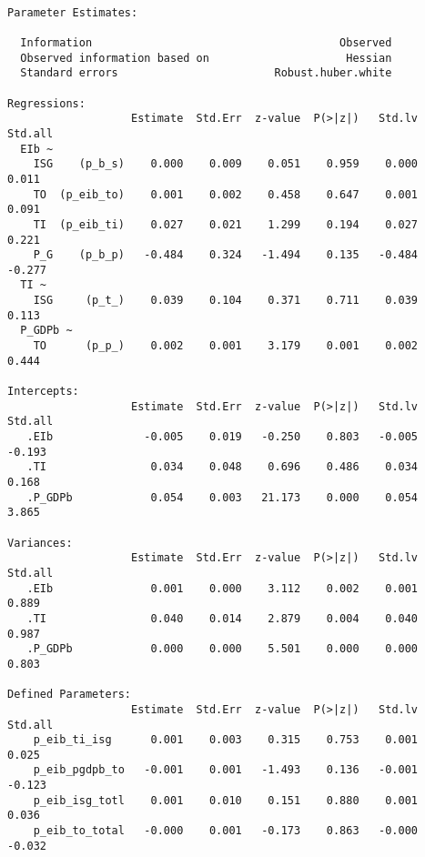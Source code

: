 \begin{verbatim}

Parameter Estimates:

  Information                                      Observed
  Observed information based on                     Hessian
  Standard errors                        Robust.huber.white

Regressions:
                   Estimate  Std.Err  z-value  P(>|z|)   Std.lv  Std.all
  EIb ~                                                                 
    ISG    (p_b_s)    0.000    0.009    0.051    0.959    0.000    0.011
    TO  (p_eib_to)    0.001    0.002    0.458    0.647    0.001    0.091
    TI  (p_eib_ti)    0.027    0.021    1.299    0.194    0.027    0.221
    P_G    (p_b_p)   -0.484    0.324   -1.494    0.135   -0.484   -0.277
  TI ~                                                                  
    ISG     (p_t_)    0.039    0.104    0.371    0.711    0.039    0.113
  P_GDPb ~                                                              
    TO      (p_p_)    0.002    0.001    3.179    0.001    0.002    0.444

Intercepts:
                   Estimate  Std.Err  z-value  P(>|z|)   Std.lv  Std.all
   .EIb              -0.005    0.019   -0.250    0.803   -0.005   -0.193
   .TI                0.034    0.048    0.696    0.486    0.034    0.168
   .P_GDPb            0.054    0.003   21.173    0.000    0.054    3.865

Variances:
                   Estimate  Std.Err  z-value  P(>|z|)   Std.lv  Std.all
   .EIb               0.001    0.000    3.112    0.002    0.001    0.889
   .TI                0.040    0.014    2.879    0.004    0.040    0.987
   .P_GDPb            0.000    0.000    5.501    0.000    0.000    0.803

Defined Parameters:
                   Estimate  Std.Err  z-value  P(>|z|)   Std.lv  Std.all
    p_eib_ti_isg      0.001    0.003    0.315    0.753    0.001    0.025
    p_eib_pgdpb_to   -0.001    0.001   -1.493    0.136   -0.001   -0.123
    p_eib_isg_totl    0.001    0.010    0.151    0.880    0.001    0.036
    p_eib_to_total   -0.000    0.001   -0.173    0.863   -0.000   -0.032

\end{verbatim}
